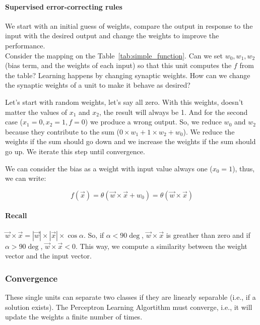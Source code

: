 \documentclass[main]{subfiles}
\begin{document}
\paragraph{Supervised error-correcting rules}
We start with an initial guess of weights, compare the output in response to the input with the desired output and change the weights to improve the performance. \\

Consider the mapping on the Table~\ref{tab:simple_function}.
Can we set $w_0, w_1, w_2$ (bias term, and the weights of each input) so that this unit computes the $f$ from the table?
Learning happens by changing synaptic weights.
How can we change the synaptic weights of a unit to make it behave as desired?

Let's start with random weights, let's say all zero.
With this weights, doesn't matter the values of $x_1$ and $x_2$, the result will always be 1.
And for the second case ($x_1 = 0, x_2 = 1, f = 0$) we produce a wrong output.
So, we reduce $w_0$ and $w_2$ because they contribute to the sum ($0 \times w_1 + 1 \times w_2 + w_0$).
We reduce the weights if the sum should go down and we increase the weights if the sum should go up. We iterate this step until convergence.

We can consider the bias as a weight with input value always one ($x_0 = 1$), thus, we can write:

\[ f(\vec{x}) = \theta(\vec{w} \times \vec{x} + w_0) = \theta(\vec{w} \times \vec{x}) \]

\paragraph{Recall} $\vec{w} \times \vec{x} = |\vec{w}| \times |\vec{x}| \times \cos \alpha$.
So, if $\alpha < 90\deg$, $\vec{w} \times \vec{x}$ is greather than zero and if $\alpha > 90\deg$, $\vec{w} \times \vec{x} < 0$.
This way, we compute a similarity between the weight vector and the input vector. \\

\subsubsection{Convergence}
These single units can separate two classes if they are linearly separable (i.e., if a solution exists). The Perceptron Learning Algortithm must converge, i.e., it will update the weights a finite number of times.
\end{document}
